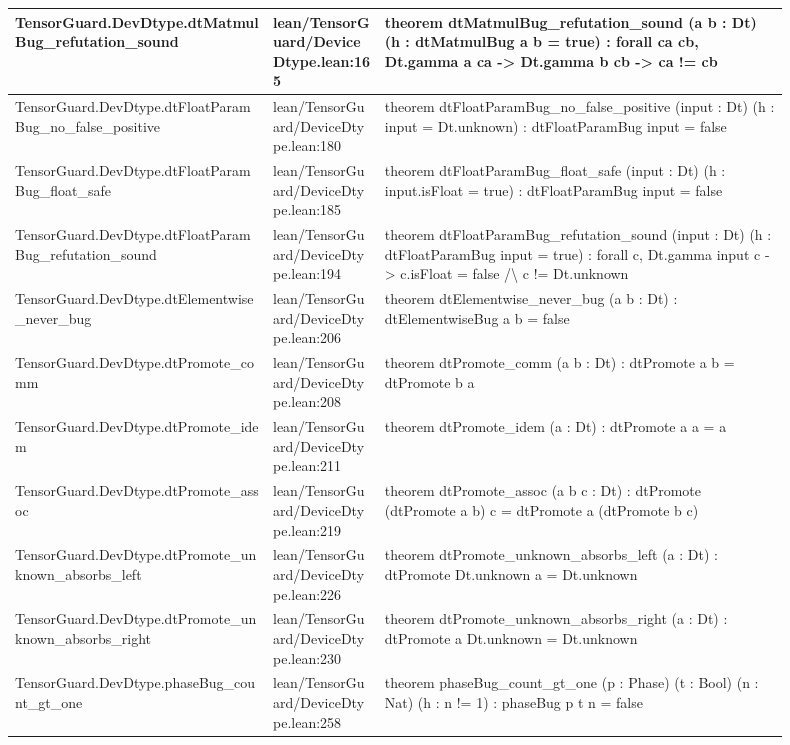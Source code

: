 \documentclass[10pt]{article}
\begin{document}
\begin{longtable}{|p{0.30\linewidth}|p{0.13\linewidth}|p{0.47\linewidth}|}
\hline
TensorGuard.DevDtype.dtMatmulBug\_refutation\_sound & lean/TensorGuard/DeviceDtype.lean:165 & theorem dtMatmulBug\_refutation\_sound (a b : Dt) (h : dtMatmulBug a b = true) : forall ca cb, Dt.gamma a ca -> Dt.gamma b cb -> ca != cb \\
\hline
TensorGuard.DevDtype.dtFloatParamBug\_no\_false\_positive & lean/TensorGuard/DeviceDtype.lean:180 & theorem dtFloatParamBug\_no\_false\_positive (input : Dt) (h : input = Dt.unknown) : dtFloatParamBug input = false \\
\hline
TensorGuard.DevDtype.dtFloatParamBug\_float\_safe & lean/TensorGuard/DeviceDtype.lean:185 & theorem dtFloatParamBug\_float\_safe (input : Dt) (h : input.isFloat = true) : dtFloatParamBug input = false \\
\hline
TensorGuard.DevDtype.dtFloatParamBug\_refutation\_sound & lean/TensorGuard/DeviceDtype.lean:194 & theorem dtFloatParamBug\_refutation\_sound (input : Dt) (h : dtFloatParamBug input = true) : forall c, Dt.gamma input c -> c.isFloat = false /\textbackslash{} c != Dt.unknown \\
\hline
TensorGuard.DevDtype.dtElementwise\_never\_bug & lean/TensorGuard/DeviceDtype.lean:206 & theorem dtElementwise\_never\_bug (a b : Dt) : dtElementwiseBug a b = false \\
\hline
TensorGuard.DevDtype.dtPromote\_comm & lean/TensorGuard/DeviceDtype.lean:208 & theorem dtPromote\_comm (a b : Dt) : dtPromote a b = dtPromote b a \\
\hline
TensorGuard.DevDtype.dtPromote\_idem & lean/TensorGuard/DeviceDtype.lean:211 & theorem dtPromote\_idem (a : Dt) : dtPromote a a = a \\
\hline
TensorGuard.DevDtype.dtPromote\_assoc & lean/TensorGuard/DeviceDtype.lean:219 & theorem dtPromote\_assoc (a b c : Dt) : dtPromote (dtPromote a b) c = dtPromote a (dtPromote b c) \\
\hline
TensorGuard.DevDtype.dtPromote\_unknown\_absorbs\_left & lean/TensorGuard/DeviceDtype.lean:226 & theorem dtPromote\_unknown\_absorbs\_left (a : Dt) : dtPromote Dt.unknown a = Dt.unknown \\
\hline
TensorGuard.DevDtype.dtPromote\_unknown\_absorbs\_right & lean/TensorGuard/DeviceDtype.lean:230 & theorem dtPromote\_unknown\_absorbs\_right (a : Dt) : dtPromote a Dt.unknown = Dt.unknown \\
\hline
TensorGuard.DevDtype.phaseBug\_count\_gt\_one & lean/TensorGuard/DeviceDtype.lean:258 & theorem phaseBug\_count\_gt\_one (p : Phase) (t : Bool) (n : Nat) (h : n != 1) : phaseBug p t n = false \\

\end{longtable}
\end{document}
